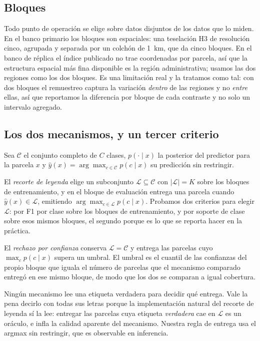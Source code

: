 \subsection{Bloques}
\label{sec:bloques}

Todo punto de operación se elige sobre datos disjuntos de los datos que lo miden. En el banco
primario los bloques son espaciales: una teselación H3 de resolución cinco, agrupada y separada por
un colchón de \SI{1}{\kilo\meter}, que da cinco bloques. En el banco de réplica el índice publicado
no trae coordenadas por parcela, así que la estructura espacial más fina disponible es la región
administrativa; usamos las dos regiones como los dos bloques. Es una limitación real y la tratamos
como tal: con dos bloques el remuestreo captura la variación \emph{dentro} de las regiones y no
\emph{entre} ellas, así que reportamos la diferencia por bloque de cada contraste y no solo un
intervalo agregado.

\subsection{Los dos mecanismos, y un tercer criterio}
\label{sec:mecanismos}

Sea $\mathcal{C}$ el conjunto completo de $C$ clases, $p(\cdot \mid x)$ la posterior del predictor
para la parcela $x$ y $\hat{y}(x) = \arg\max_{c \in \mathcal{C}} p(c \mid x)$ su predicción sin
restringir.

El \emph{recorte de leyenda} elige un subconjunto $\mathcal{L} \subseteq \mathcal{C}$ con
$|\mathcal{L}| = K$ sobre los bloques de entrenamiento, y en el bloque de evaluación entrega una
parcela cuando $\hat{y}(x) \in \mathcal{L}$, emitiendo $\arg\max_{c \in \mathcal{L}} p(c \mid x)$.
Probamos dos criterios para elegir $\mathcal{L}$: por F1 por clase sobre los bloques de
entrenamiento, y por soporte de clase sobre esos mismos bloques, el segundo porque es lo que se
reporta hacer en la práctica.

El \emph{rechazo por confianza} conserva $\mathcal{L} = \mathcal{C}$ y entrega las parcelas cuyo
$\max_c p(c \mid x)$ supera un umbral. El umbral es el cuantil de las confianzas del propio bloque
que iguala el número de parcelas que el mecanismo comparado entregó en ese mismo bloque, de modo
que los dos se comparan a igual cobertura.

Ningún mecanismo lee una etiqueta verdadera para decidir qué entrega. Vale la pena decirlo con
todas sus letras porque la implementación natural del recorte de leyenda sí la lee: entregar las
parcelas cuya etiqueta \emph{verdadera} cae en $\mathcal{L}$ es un oráculo, e infla la calidad
aparente del mecanismo. Nuestra regla de entrega usa el argmax sin restringir, que es observable en
inferencia.

